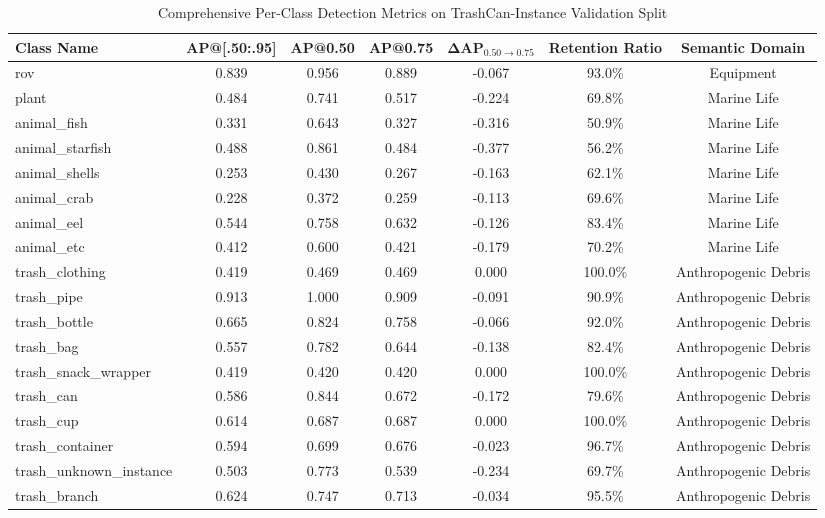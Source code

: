 \documentclass[conference]{IEEEtran}
\begin{document}
\begin{table}[t]
\caption{Comprehensive Per-Class Detection Metrics on TrashCan-Instance Validation Split}
\label{tab:per_class}
\centering
\begin{tabular}{lcccccc}
\toprule
\textbf{Class Name} & \textbf{AP@[.50:.95]} & \textbf{AP@0.50} & \textbf{AP@0.75} & $\mathbf{\Delta\text{AP}_{0.50 \to 0.75}}$ & \textbf{Retention Ratio} & \textbf{Semantic Domain} \\
\midrule
rov & 0.839 & 0.956 & 0.889 & -0.067 & 93.0\% & Equipment \\
plant & 0.484 & 0.741 & 0.517 & -0.224 & 69.8\% & Marine Life \\
animal\_fish & 0.331 & 0.643 & 0.327 & -0.316 & 50.9\% & Marine Life \\
animal\_starfish & 0.488 & 0.861 & 0.484 & -0.377 & 56.2\% & Marine Life \\
animal\_shells & 0.253 & 0.430 & 0.267 & -0.163 & 62.1\% & Marine Life \\
animal\_crab & 0.228 & 0.372 & 0.259 & -0.113 & 69.6\% & Marine Life \\
animal\_eel & 0.544 & 0.758 & 0.632 & -0.126 & 83.4\% & Marine Life \\
animal\_etc & 0.412 & 0.600 & 0.421 & -0.179 & 70.2\% & Marine Life \\
trash\_clothing & 0.419 & 0.469 & 0.469 & 0.000 & 100.0\% & Anthropogenic Debris \\
trash\_pipe & 0.913 & 1.000 & 0.909 & -0.091 & 90.9\% & Anthropogenic Debris \\
trash\_bottle & 0.665 & 0.824 & 0.758 & -0.066 & 92.0\% & Anthropogenic Debris \\
trash\_bag & 0.557 & 0.782 & 0.644 & -0.138 & 82.4\% & Anthropogenic Debris \\
trash\_snack\_wrapper & 0.419 & 0.420 & 0.420 & 0.000 & 100.0\% & Anthropogenic Debris \\
trash\_can & 0.586 & 0.844 & 0.672 & -0.172 & 79.6\% & Anthropogenic Debris \\
trash\_cup & 0.614 & 0.687 & 0.687 & 0.000 & 100.0\% & Anthropogenic Debris \\
trash\_container & 0.594 & 0.699 & 0.676 & -0.023 & 96.7\% & Anthropogenic Debris \\
trash\_unknown\_instance & 0.503 & 0.773 & 0.539 & -0.234 & 69.7\% & Anthropogenic Debris \\
trash\_branch & 0.624 & 0.747 & 0.713 & -0.034 & 95.5\% & Anthropogenic Debris \\

\end{tabular}
\end{table}
\end{document}
